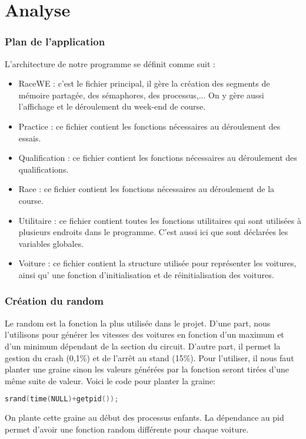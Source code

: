 \documentclass[11pt,a4paper]{article}
\begin{document}
\newpage
\part{Analyse}

\section{Plan de l'application}

L'architecture de notre programme se définit comme suit :
\begin{itemize}

\item RaceWE : c'est le fichier principal, il gère la création des segments de mémoire partagée, des sémaphores, des processus,... On y gère aussi l'affichage et le déroulement du week-end de course.
\item Practice : ce fichier contient les fonctions nécessaires au déroulement des essais.
\item Qualification : ce fichier contient les fonctions nécessaires au déroulement des qualifications.
\item Race : ce fichier contient les fonctions nécessaires au déroulement de la course. 
\item Utilitaire : ce fichier contient toutes les fonctions utilitaires qui sont utilisées à plusieurs endroits dans le programme. C'est aussi ici que sont déclarées les variables globales.
\item Voiture : ce fichier contient la structure utilisée pour représenter les voitures, ainsi qu' une fonction d'initialisation et de réinitialisation des voitures.

\end{itemize}

\section{Création du random}
Le random est la fonction la plus utilisée dans le projet. D'une part, nous l'utilisons pour générer les vitesses des voitures en fonction d'un maximum et d'un minimum dépendant de la section du circuit. D'autre part, il permet la gestion du crash (0,1\%) et de l'arrêt au stand (15\%).
Pour l'utiliser, il nous faut planter une graine sinon les valeurs générées par la fonction seront tirées d'une même suite de valeur. Voici le code pour planter la graine:
\begin{lstlisting}[language=c]
srand(time(NULL)+getpid());
\end{lstlisting}
On plante cette graine au début des processus enfants. La dépendance au pid permet d'avoir une fonction random différente pour chaque voiture.\par
\end{document}
